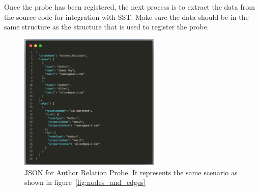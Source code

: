 Once the probe has been registered, the next process is to extract the data from the source code for integration with SST. Make sure the data should be in the same structure as the structure that is used to register the probe. 

\begin{figure}[H]
    \centering
    \includegraphics[width=0.60\textwidth]{figures/author_relation_int.png}
    \caption{JSON for Author Relation Probe. It represents the same scenario as shown in figure~\ref{fig:nodes_and_edges}}
    \label{fig:json_author_relation_int}
\end{figure}